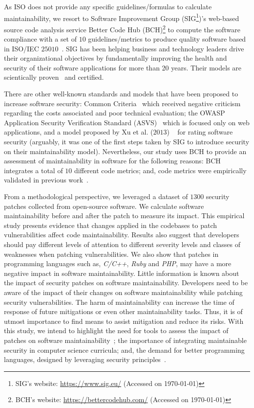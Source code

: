 \documentclass[smallextended]{svjour3}       %
\begin{document}
As ISO does not provide any specific guidelines/formulas to 
calculate maintainability, we resort to Software Improvement Group 
(SIG\footnote{SIG's website: 
\url{https://www.sig.eu/} (Accessed on \today{})})'s web-based source 
code analysis service Better Code Hub (BCH)\footnote{BCH's 
website: \url{https://bettercodehub.com/} (Accessed on \today{})}  
to compute the software compliance with a set of $10$ 
guidelines/metrics to produce quality software based in ISO/IEC 
$25010$~\cite{Visser:2016:OREILLY}. SIG 
has been helping business and technology leaders drive their organizational 
objectives by fundamentally improving the health and security of 
their software applications for more than 20 years. Their 
models are scientically proven~\cite{5609747,6113040,baggen2012} and certified.

There are other well-known 
standards and models that have been proposed to increase software 
security: Common Criteria~\cite{common:2009} which received
negative criticism regarding the costs associated and poor technical 
evaluation; the OWASP Application Security Verification 
Standard (ASVS)~\cite{oswap:2009} which is focused only on web 
applications, and a model proposed by Xu et al. ($2013$)
~\cite{6616351} for rating software security (arguably, it was one 
of the first steps taken by SIG to introduce security on their 
maintainability model). Nevertheless, our study uses BCH to provide 
an assessment of maintainability in software for the following 
reasons: BCH integrates a total of $10$ different code metrics; and, 
code metrics were empirically validated in previous 
work~\cite{Bijlsma:2012:FIR:2317098.2317124,8530041,8919169,8785997}.

From a methodological perspective, we leveraged a dataset of $1300$ 
security patches collected from open-source software. We calculate 
software maintainability before and after the patch to measure its 
impact. This empirical study presents evidence that changes applied 
in the codebases to patch vulnerabilities affect code 
maintainability. Results also suggest that developers 
should pay different levels of attention to different severity 
levels and classes of weaknesses when patching vulnerabilities. We 
also show that patches in programming languages such as, 
\emph{C/C++}, \emph{Ruby} and \emph{PHP}, may have a more negative 
impact in software maintainability. Little information is known 
about the impact of security patches on software 
maintainability. Developers need to be aware of the impact of their 
changes on software maintainability while patching security 
vulnerabilities. The harm of maintainability can increase the time 
of response of future mitigations or even other maintainability 
tasks. Thus, it is of utmost importance to find means to assist 
mitigation and reduce its risks. With this study, we intend to 
highlight the need for tools to assess the impact of patches on 
software maintainability~\cite{4724577}; the importance of 
integrating maintainable security in computer science curricula; 
and, the demand for better programming languages, designed by 
leveraging security principles~\cite{kurilova2014wyvern,10.1145/2489828.2489830}. 
 
\end{document}
